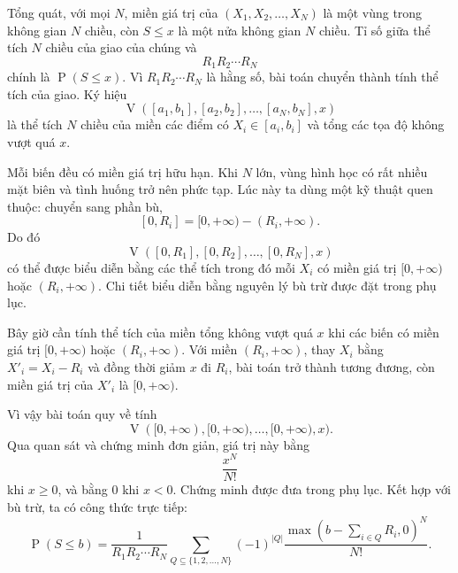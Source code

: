 \documentclass[11pt]{article}
\newcommand{\Prob}{\operatorname{P}}
\newcommand{\Vol}{\operatorname{V}}
\begin{document}
\begin{center}
\end{center}

Tổng quát, với mọi \(N\), miền giá trị của
\((X_1,X_2,\ldots,X_N)\) là một vùng trong không gian \(N\) chiều, còn
\(S\le x\) là một nửa không gian \(N\) chiều. Tỉ số giữa thể tích \(N\) chiều
của giao của chúng và
\[
  R_1R_2\cdots R_N
\]
chính là \(\Prob(S\le x)\). Vì \(R_1R_2\cdots R_N\) là hằng số, bài toán
chuyển thành tính thể tích của giao. Ký hiệu
\[
  \Vol([a_1,b_1],[a_2,b_2],\ldots,[a_N,b_N],x)
\]
là thể tích \(N\) chiều của miền các điểm có \(X_i\in[a_i,b_i]\) và tổng các
tọa độ không vượt quá \(x\).

Mỗi biến đều có miền giá trị hữu hạn. Khi \(N\) lớn, vùng hình học có rất
nhiều mặt biên và tình huống trở nên phức tạp. Lúc này ta dùng một kỹ thuật
quen thuộc: chuyển sang phần bù,
\[
  [0,R_i]=[0,+\infty)-(R_i,+\infty).
\]
Do đó
\[
  \Vol([0,R_1],[0,R_2],\ldots,[0,R_N],x)
\]
có thể được biểu diễn bằng các thể tích trong đó mỗi \(X_i\) có miền giá trị
\([0,+\infty)\) hoặc \((R_i,+\infty)\). Chi tiết biểu diễn bằng nguyên lý bù
trừ được đặt trong phụ lục.

Bây giờ cần tính thể tích của miền tổng không vượt quá \(x\) khi các biến có
miền giá trị \([0,+\infty)\) hoặc \((R_i,+\infty)\). Với miền
\((R_i,+\infty)\), thay \(X_i\) bằng \(X'_i=X_i-R_i\) và đồng thời giảm \(x\)
đi \(R_i\), bài toán trở thành tương đương, còn miền giá trị của \(X'_i\) là
\([0,+\infty)\).

Vì vậy bài toán quy về tính
\[
  \Vol([0,+\infty),[0,+\infty),\ldots,[0,+\infty),x).
\]
Qua quan sát và chứng minh đơn giản, giá trị này bằng
\[
  \frac{x^N}{N!}
\]
khi \(x\ge 0\), và bằng \(0\) khi \(x<0\). Chứng minh được đưa trong phụ lục.
Kết hợp với bù trừ, ta có công thức trực tiếp:
\[
  \Prob(S\le b)
  =
  \frac{1}{R_1R_2\cdots R_N}
  \sum_{Q\subseteq\{1,2,\ldots,N\}}
  (-1)^{|Q|}
  \frac{\max\left(b-\sum_{i\in Q}R_i,0\right)^N}{N!}.
\]
\end{document}
